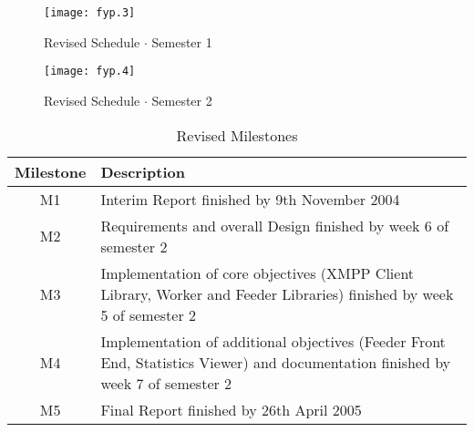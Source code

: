 \begin{figure}[H]
\begin{flushleft}
\texttt{[image: fyp.3]}
\end{flushleft}
\caption{Revised Schedule $\cdot$ Semester 1}
\label{fig:rev_gantt1}
\end{figure}

\begin{figure}[H]
\begin{flushleft}
\texttt{[image: fyp.4]}
\end{flushleft}
\caption{Revised Schedule $\cdot$ Semester 2}
\label{fig:rev_gantt2}
\end{figure}

\begin{table}[H]
\begin{tabularx}{\linewidth}{cX}
\toprule
\textbf{Milestone} & \textbf{Description} \\
\midrule
\endhead
M1 & Interim Report finished by 9th November 2004 \\
M2 & Requirements and overall Design finished by week 6 of semester 2 \\
M3 & Implementation of core objectives (XMPP Client Library, Worker and Feeder Libraries) finished by week 5 of semester 2 \\
M4 & Implementation of additional objectives (Feeder Front End, Statistics Viewer) and documentation finished by week 7 of semester 2 \\
M5 & Final Report finished by 26th April 2005 \\
\bottomrule
\end{tabularx}
\caption{Revised Milestones}
\label{tab:rev_milestones}
\end{table}
